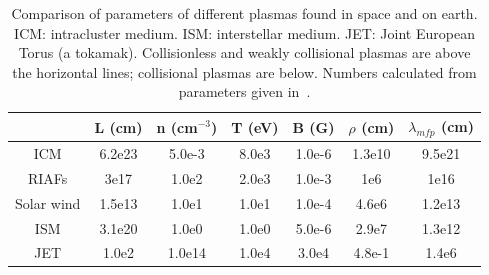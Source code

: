 \begin{table}[h]
  \centering
  \begin{tabular}{c|c|c|c|c|c|c}  
    & L (cm) & n (cm$^{-3}$) & T (eV) & B (G) & $\rho$ (cm) & $\lambda_{mfp}$ (cm) \\ \hline\hline
    ICM & 6.2e23 & 5.0e-3 & 8.0e3 & 1.0e-6 & 1.3e10 & 9.5e21 \\ 
    RIAFs & 3e17 & 1.0e2 & 2.0e3 & 1.0e-3 & 1e6 & 1e16  \\ 
    Solar wind & 1.5e13 & 1.0e1 & 1.0e1 & 1.0e-4 & 4.6e6 & 1.2e13  \\ \hline
    ISM & 3.1e20 & 1.0e0 & 1.0e0 & 5.0e-6 & 2.9e7 & 1.3e12  \\ 
    JET & 1.0e2 & 1.0e14 & 1.0e4 & 3.0e4 & 4.8e-1 & 1.4e6  \\ 
  \end{tabular}
  \caption{Comparison of parameters of different plasmas found in space and on earth. ICM: intracluster medium. ISM: interstellar medium. JET: Joint European Torus (a tokamak). Collisionless and weakly collisional plasmas are above the horizontal lines; collisional plasmas are below. Numbers calculated from parameters given in~\cite{Kunz2010,AST521Pset1}.}
  \label{table:paramCompare}
\end{table}



